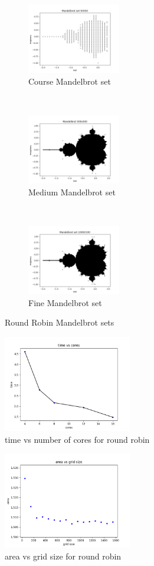 \documentclass[12pt]{article}
\theoremstyle{plain}
\theoremstyle{definition}
\begin{document}
\begin{figure}[t!]
    \centering
    \begin{subfigure}[t]{0.5\textwidth}
        \centering
        \includegraphics[height=1.2in]{mandelbrot_course_c.png}
        \caption{Course Mandelbrot set}
    \end{subfigure}%
    ~
    \begin{subfigure}[t]{0.5\textwidth}
        \centering
        \includegraphics[height=1.2in]{mandelbrot_medium_c.png}
        \caption{Medium Mandelbrot set}
    \end{subfigure}
    ~
        \begin{subfigure}[t]{0.5\textwidth}
        \centering
        \includegraphics[height=1.2in]{mandelbrot_fine_c.png}
        \caption{Fine Mandelbrot set}
    \end{subfigure}%
    \caption{Round Robin Mandelbrot sets}
\end{figure}

\begin{figure}
 \centering
        \includegraphics[width=0.5\textwidth]{time_c.png}
        \caption{time vs number of cores for round robin}
\end{figure}

\begin{figure}
 \centering
        \includegraphics[width=0.5\textwidth]{area_c.png}
        \caption{area vs grid size for round robin}
\end{figure}
\end{document}
